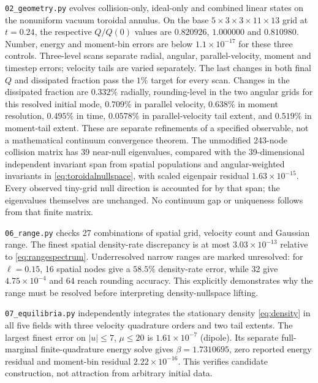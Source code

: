 \documentclass[11pt,letterpaper]{article}
\begin{document}
\texttt{02\_geometry.py} evolves collision-only, ideal-only and combined linear
states on the nonuniform vacuum toroidal annulus. On the base
$5\times3\times3\times11\times13$ grid at $t=0.24$, the respective $Q/Q(0)$ values
are $0.820926$, $1.000000$ and $0.810980$. Number, energy and moment-bin errors
are below $1.1\times10^{-17}$ for these three controls. Three-level scans separate
radial, angular, parallel-velocity, moment and timestep errors; velocity tails
are varied separately. The last changes in both final $Q$ and dissipated fraction pass the $1\%$
target for every scan. Changes in the dissipated fraction are $0.332\%$ radially,
rounding-level in the two angular grids for this resolved initial mode,
$0.709\%$ in parallel velocity, $0.638\%$ in moment resolution, $0.495\%$ in time,
$0.0578\%$ in parallel-velocity tail extent, and $0.519\%$ in moment-tail extent.
These are separate refinements of a specified observable, not a mathematical
continuum convergence theorem. The unmodified 243-node collision matrix has
39 near-null eigenvalues, compared with the 39-dimensional independent invariant
span from spatial populations and angular-weighted invariants in
\eqref{eq:toroidalnullspace}, with scaled
eigenpair residual $1.63\times10^{-15}$. Every observed tiny-grid null direction is accounted for by that span; the
eigenvalues themselves are unchanged. No continuum gap or uniqueness follows
from that finite matrix.

\texttt{06\_range.py} checks 27 combinations of spatial grid, velocity count and
Gaussian range. The finest spatial density-rate discrepancy is at most
$3.03\times10^{-13}$ relative to \eqref{eq:rangespectrum}. Underresolved narrow
ranges are marked unresolved: for $\ell=0.15$, 16 spatial nodes give a $58.5\%$
density-rate error, while 32 give $4.75\times10^{-4}$ and 64 reach rounding
accuracy. This explicitly demonstrates why the range must be resolved before
interpreting density-nullspace lifting.

\texttt{07\_equilibria.py} independently integrates the stationary density
\eqref{eq:density} in all five fields with three velocity quadrature orders and
two tail extents. The largest finest error on $|u|\le7$, $\mu\le20$ is
$1.61\times10^{-7}$ (dipole). Its separate full-marginal finite-quadrature energy
solve gives $\beta=1.7310695$, zero reported energy residual and moment-bin
residual $2.22\times10^{-16}$. This verifies candidate construction, not
attraction from arbitrary initial data.
\end{document}
